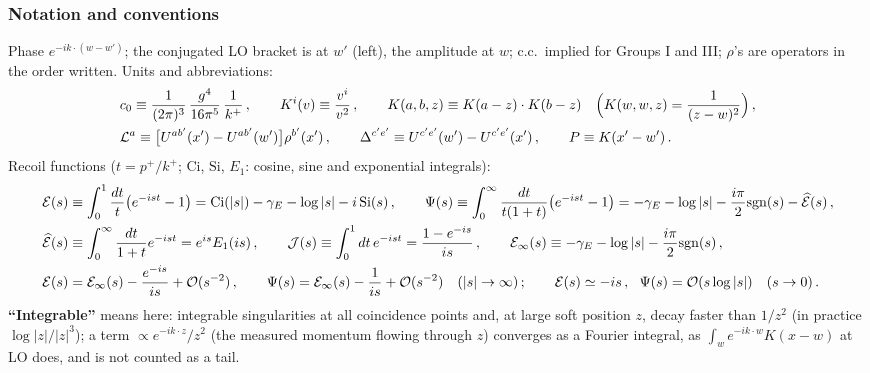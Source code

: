 \documentclass[10pt]{article}
\begin{document}
\subsubsection{Notation and conventions}
\noindent Phase $e^{-ik\cdot(w-w')}$; the conjugated LO bracket is at $w'$ (left), the amplitude at $w$; c.c.\ implied for Groups I and III; $\rho$'s are operators in the order written. Units and abbreviations:
\begin{align}
&c_{0}\equiv\frac{1}{(2\pi)^{3}}\,\frac{g^{4}}{16\pi^{5}}\,\frac{1}{k^{+}}\,,\qquad K^{i}(v)\equiv\frac{v^{i}}{v^{2}}\,,\qquad K(a,b,z)\equiv K(a-z)\cdot K(b-z)\quad\Big(K(w,w,z)=\frac{1}{(z-w)^{2}}\Big)\,,\notag\\
&\mathcal{L}^{a}\equiv\big[U^{ab'}(x')-U^{ab'}(w')\big]\rho^{b'}(x')\,,\qquad \Delta^{c'e'}\equiv U^{c'e'}(w')-U^{c'e'}(x')\,,\qquad P\equiv K(x'-w')\,.\notag
\end{align}
Recoil functions ($t=p^{+}/k^{+}$; $\mathrm{Ci}$, $\mathrm{Si}$, $E_{1}$: cosine, sine and exponential integrals):
\begin{align}
\mathcal{E}(s)&\equiv\int_{0}^{1}\frac{dt}{t}\big(e^{-ist}-1\big)=\mathrm{Ci}(|s|)-\gamma_{E}-\log|s|-i\,\mathrm{Si}(s)\,,\qquad
\Psi(s)\equiv\int_{0}^{\infty}\frac{dt}{t(1+t)}\big(e^{-ist}-1\big)=-\gamma_{E}-\log|s|-\frac{i\pi}{2}{\rm sgn}(s)-\widehat{\mathcal{E}}(s)\,,\notag\\
\widehat{\mathcal{E}}(s)&\equiv\int_{0}^{\infty}\frac{dt}{1+t}e^{-ist}=e^{is}E_{1}(is)\,,\qquad \mathcal{J}(s)\equiv\int_{0}^{1}dt\,e^{-ist}=\frac{1-e^{-is}}{is}\,,\qquad
\mathcal{E}_{\infty}(s)\equiv-\gamma_{E}-\log|s|-\frac{i\pi}{2}{\rm sgn}(s)\,,\label{sf:fun}\\
\mathcal{E}(s)&=\mathcal{E}_{\infty}(s)-\frac{e^{-is}}{is}+{\cal O}(s^{-2})\,,\qquad \Psi(s)=\mathcal{E}_{\infty}(s)-\frac{1}{is}+{\cal O}(s^{-2})\quad(|s|\to\infty)\,;\qquad \mathcal{E}(s)\simeq-is\,,\ \ \Psi(s)={\cal O}(s\log|s|)\quad(s\to0)\,.\notag
\end{align}
\textbf{``Integrable''} means here: integrable singularities at all coincidence points and, at large soft position $z$, decay faster than $1/z^{2}$ (in practice $\log|z|/|z|^{3}$); a term $\propto e^{-ik\cdot z}/z^{2}$ (the measured momentum flowing through $z$) converges as a Fourier integral, as $\int_{w}e^{-ik\cdot w}K(x-w)$ at LO does, and is not counted as a tail.
\end{document}
